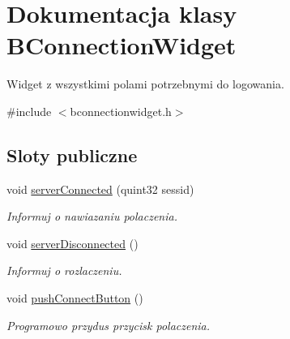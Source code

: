 \hypertarget{class_b_connection_widget}{
\section{Dokumentacja klasy BConnectionWidget}
\label{class_b_connection_widget}
}


Widget z wszystkimi polami potrzebnymi do logowania.  


{\ttfamily \#include $<$bconnectionwidget.h$>$}\subsection*{Sloty publiczne}
\begin{DoxyCompactItemize}
\item 
void \hyperlink{class_b_connection_widget_a7c9d3a266939c6719fe198f9b3d67636}{serverConnected} (quint32 sessid)
\begin{DoxyCompactList}\small\item\em Informuj o nawiazaniu polaczenia. \item\end{DoxyCompactList}\item 
void \hyperlink{class_b_connection_widget_a159829b06e46c68a354ec999d4b15b61}{serverDisconnected} ()
\begin{DoxyCompactList}\small\item\em Informuj o rozlaczeniu. \item\end{DoxyCompactList}\item 
\hypertarget{class_b_connection_widget_a049a2058a096bd48f3eb5c51bfe765f6}{
void \hyperlink{class_b_connection_widget_a049a2058a096bd48f3eb5c51bfe765f6}{pushConnectButton} ()}
\label{class_b_connection_widget_a049a2058a096bd48f3eb5c51bfe765f6}

\begin{DoxyCompactList}\small\item\em Programowo przydus przycisk polaczenia. \item\end{DoxyCompactList}\end{DoxyCompactItemize}
